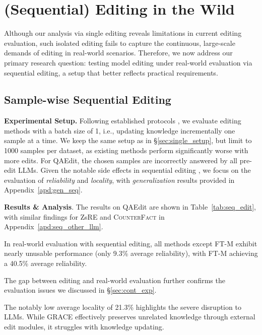 
\section{(Sequential) Editing in the Wild}


Although our analysis via single editing reveals limitations in current editing evaluation, such isolated editing fails to capture the continuous, large-scale demands of editing in real-world scenarios.
Therefore, we now address our primary research question: testing model editing under real-world evaluation via sequential editing, a setup that better reflects practical requirements.

\subsection{Sample-wise Sequential Editing}
\label{sec:bs_1_seq_edit}


\noindent \textbf{Experimental Setup.} 
Following established protocols \cite{huang2023transformerpatcher, hartvigsen2023aging}, we evaluate editing methods with a batch size of 1, i.e., updating knowledge incrementally one sample at a time.
We keep the same setup as in \S\ref{sec:single_setup}, but limit to 1000 samples per dataset, as existing methods perform significantly worse with more edits.
For QAEdit, the chosen samples are incorrectly answered by all pre-edit LLMs.
Given the notable side effects in sequential editing \cite{yang-etal-2024-butterfly}, we focus on  the evaluation of \textit{reliability} and \textit{locality}, with \textit{generalization} results provided in Appendix~\ref{apd:gen_seq}.


\noindent \textbf{Results \& Analysis}. 
The results on QAEdit are shown in Table~\ref{tab:seq_edit}, with similar findings for ZsRE and \textsc{CounterFact} in Appendix~\ref{apd:seq_other_llm}.
\begin{enumerate*}[label=\roman*)]
    \item In real-world evaluation with sequential editing, all methods except FT-M exhibit nearly unusable performance (only 9.3\% average reliability), with FT-M achieving a 40.5\% average reliability.
    \item The gap between editing and real-world evaluation further confirms the evaluation issues we discussed in \S\ref{sec:cont_exp}.
    \item The notably low average locality of 21.3\% highlights the severe disruption to LLMs. While GRACE effectively preserves unrelated knowledge through external edit modules, it struggles with knowledge updating.
\end{enumerate*}



